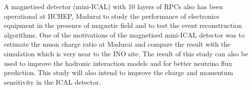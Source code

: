 A magnetised detector (mini-ICAL) with 10 layers of RPCs also has been
operational at IICHEP, Madurai to study the performance of electronics
equipment in the presence of magnetic field and to test the event
reconstruction algorithms. One of the motivations of the magnetised
mini-ICAL detector was to estimate the muon charge ratio at Madurai
and compare the result with the simulation which is very near to the
INO site. The result of this study can also be used to improve the
hadronic interaction models and for better neutrino flux prediction.
This study will also intend to improve the charge and momentum
sensitivity in the ICAL detector.

